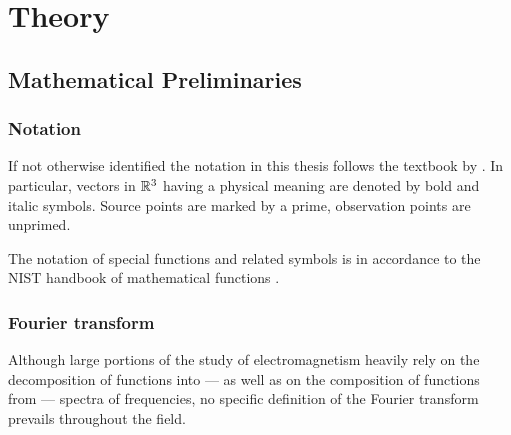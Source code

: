 \chapter{Theory}
\label{ch:theory}

\section{Mathematical Preliminaries}

\subsection{Notation}

If not otherwise identified the notation in this thesis follows the textbook
by \textcite{vanBladel2007}.
In particular, vectors in $\mathbb{R}^3$ having a physical meaning are denoted by bold
and italic symbols.
Source points are marked by a prime, observation points are unprimed.

The notation of special functions and related symbols is in accordance to the
NIST handbook of mathematical functions \cite{Olver2010}.





\subsection{Fourier transform}

Although large portions of the study of electromagnetism heavily rely on the
decomposition of functions into --- as well as on the composition of functions
from --- spectra of frequencies, no specific definition of the Fourier transform
prevails throughout the field.

